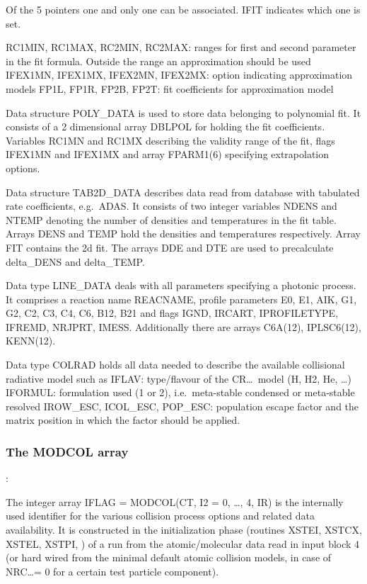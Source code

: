 Of the 5 pointers one and only one can be associated.
IFIT indicates which one is set.

RC1MIN, RC1MAX, RC2MIN, RC2MAX: ranges for first and second parameter in the
fit formula.
Outside the range an approximation should be used IFEX1MN, IFEX1MX, IFEX2MN,
IFEX2MX: option indicating approximation models FP1L, FP1R, FP2B, FP2T: fit
coefficients for approximation model

Data structure POLY\_DATA is used to store data belonging to polynomial fit.
It consists of a 2 dimensional array DBLPOL for holding the fit coefficients.
Variables RC1MN and RC1MX describing the validity range of the fit, flags
IFEX1MN and IFEX1MX and array FPARM1(6) specifying extrapolation options.

Data structure TAB2D\_DATA describes data read from database with tabulated
rate coefficients, e.g.\ \ac{ADAS}.
It consists of two integer variables NDENS and NTEMP denoting the number of
densities and temperatures in the fit table.
Arrays DENS and TEMP hold the densities and temperatures respectively.
Array FIT contains the 2d fit.
The arrays DDE and DTE are used to precalculate delta\_DENS and delta\_TEMP.

Data type LINE\_DATA deals with all parameters specifying a photonic process.
It comprises a reaction name REACNAME, profile parameters E0, E1, AIK, G1, G2,
C2, C3, C4, C6, B12, B21 and flags IGND, IRCART, IPROFILETYPE, IFREMD, NRJPRT,
IMESS.
Additionally there are arrays  C6A(12), IPLSC6(12), KENN(12).

Data type COLRAD holds all data needed to describe the available collisional
radiative model such as IFLAV: type/flavour of the CR\dots\ model (H, H2, He,
\dots) IFORMUL: formulation used (1 or 2), i.e.\ meta-stable condensed or
meta-stable resolved IROW\_ESC, ICOL\_ESC, POP\_ESC: population escape factor
and the matrix position in which the factor should be applied.

\subsubsection{The MODCOL array}:

The integer array IFLAG = MODCOL(CT, I2 = 0, \dots, 4, IR) is the internally
used identifier for the various collision process options and related data
availability.
It is constructed in the initialization phase (routines XSTEI, XSTCX, XSTEL,
XSTPI, ) of a run from the atomic\slash molecular data read in input block 4
(or hard wired from the minimal default atomic collision models, in case of
NRC\dots = 0 for a certain test particle component).

